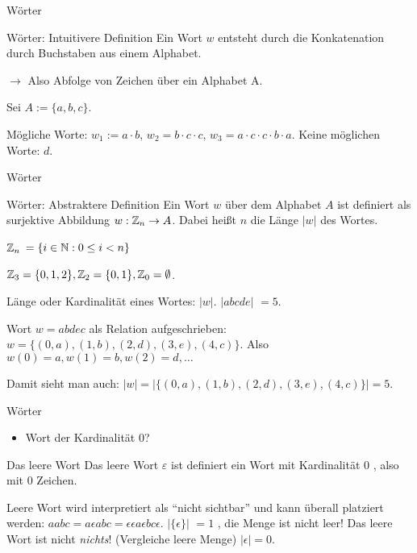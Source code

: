 \begin{frame}{Wörter}
	\begin{block}{Wörter: Intuitivere Definition}
		Ein Wort $w$ entsteht durch die Konkatenation durch Buchstaben aus einem Alphabet.
	\end{block}

	$\rightarrow$ Also Abfolge von Zeichen über ein Alphabet A.

	\pause Sei $A := \{a, b, c\}$.

	\begin{itemize}
		\pitem Mögliche Worte: \pause $w_1 := a \cdot b$\pause , $w_2 = b \cdot c \cdot c$\pause , $w_3 = a \cdot c \cdot c \cdot b \cdot a$.
		\pitem Keine möglichen Worte: \pause $d$.
		\end{itemize}
\end{frame}

\begin{frame}{Wörter}
	\begin{block}{Wörter: Abstraktere Definition}
		Ein Wort $w$  über dem Alphabet $A$  ist definiert als surjektive Abbildung  $w : \mathbb{Z}_n \rightarrow A$. Dabei heißt $n$ die Länge $|w|$ des Wortes.
	\end{block}

	\begin{itemize}
		\pitem $\mathbb{Z}_n$  $ = \{i \in \mathbb{N} : 0 \leq i < n \}$
		
		\pause $\mathbb{Z}_3  = \{0, 1, 2\},  \mathbb{Z}_2 = \{0, 1\}, \mathbb{Z}_0 = \emptyset$.
		
		\pitem Länge oder Kardinalität eines Wortes:  $|w|$. \pause $|abcde|$ $= 5$.
		
		\pitem Wort $w = abdec$ als Relation aufgeschrieben: \pause $w = \{(0, a), (1, b), (2, d), (3, e), (4, c)\}$.  Also $w(0) = a, w(1) = b, w(2) = d, \dots$
		
		\pause Damit sieht man auch: $|w| = |\{(0, a), (1, b), (2, d), (3, e), (4, c)\}| = 5$.
	\end{itemize}
\end{frame}

\begin{frame}{Wörter}
	\begin{itemize}
		\item Wort der Kardinalität 0?
	\end{itemize}

	\pause

	\begin{block}{Das leere Wort}
		Das leere Wort $\varepsilon$ ist definiert ein Wort mit Kardinalität 0 , also mit 0 Zeichen.
	\end{block}

	\begin{itemize}
		\pitem Leere Wort wird interpretiert als ``nicht sichtbar'' und kann überall platziert werden\pause : $aabc = a\epsilon abc = \epsilon\epsilon a\epsilon bc \epsilon$.
		\pitem $|\{\epsilon\}|$ \pause $ = 1$ , die Menge ist nicht leer! Das leere Wort ist nicht \emph{nichts}! (Vergleiche leere Menge)
		\pitem $|\epsilon| = 0$.
	\end{itemize}
\end{frame}

